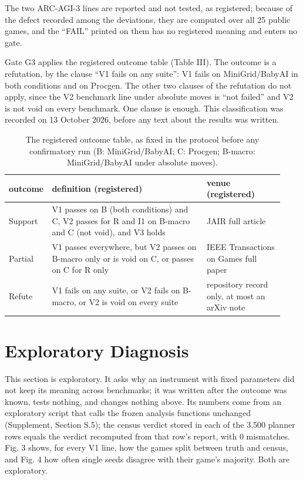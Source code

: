 \documentclass[journal]{IEEEtran}
\begin{document}
The two ARC-AGI-3 lines are reported and not tested, as registered;
because of the defect recorded among the deviations, they are computed
over all 25 public games, and the ``FAIL'' printed on them has no
registered meaning and enters no gate.

Gate G3 applies the registered outcome table (Table III). The outcome is
a refutation, by the clause ``V1 fails on any suite'': V1 fails on
MiniGrid/BabyAI in both conditions and on Procgen. The other two clauses
of the refutation do not apply, since the V2 benchmark line under
absolute moves is ``not failed'' and V2 is not void on every benchmark.
One clause is enough. This classification was recorded on 13 October
2026, before any text about the results was written.

\begin{table}[!t]
\caption{The registered outcome table, as fixed in the protocol before any
confirmatory run (B: MiniGrid/BabyAI; C: Procgen; B-macro:
MiniGrid/BabyAI under absolute moves).}
\centering
\footnotesize
\renewcommand{\arraystretch}{1.15}
\setlength{\tabcolsep}{4pt}
\begin{tabular}{>{\raggedright\arraybackslash}p{0.087\linewidth}>{\raggedright\arraybackslash}p{0.562\linewidth}>{\raggedright\arraybackslash}p{0.285\linewidth}}
\hline
\textbf{outcome} & \textbf{definition (registered)} & \textbf{venue (registered)} \\ \hline
Support & V1 passes on B (both conditions) and C, V2 passes for R and I1 on
B-macro and C (not void), and V3 holds & JAIR full article \\
Partial & V1 passes everywhere, but V2 passes on B-macro only or is void on C, or
passes on C for R only & IEEE Transactions on Games full paper \\
Refute & V1 fails on any suite, or V2 fails on B-macro, or V2 is void on every
suite & repository record only, at most an arXiv note \\
\hline
\end{tabular}
\end{table}

\section{Exploratory Diagnosis}\label{exploratory-diagnosis}

This section is exploratory. It asks why an instrument with fixed
parameters did not keep its meaning across benchmarks; it was written
after the outcome was known, tests nothing, and changes nothing above.
Its numbers come from an exploratory script that calls the frozen
analysis functions unchanged (Supplement, Section S.5); the census
verdict stored in each of the 3,500 planner rows equals the verdict
recomputed from that row's report, with 0 mismatches. Fig. 3 shows, for
every V1 line, how the games split between truth and census, and Fig. 4
how often single seeds disagree with their game's majority. Both are
exploratory.
\end{document}

